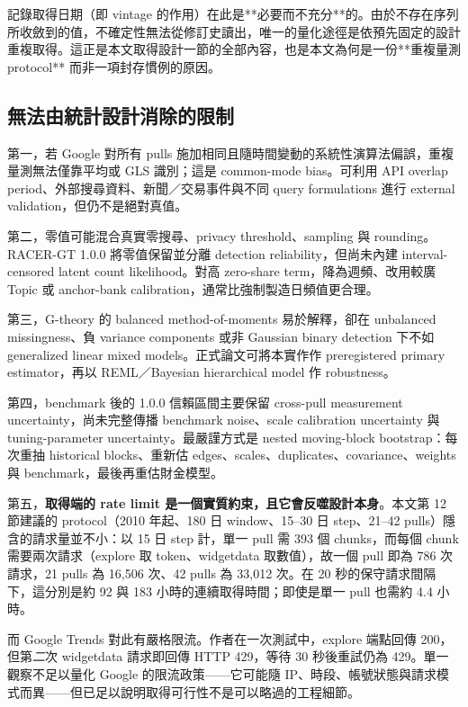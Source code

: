\documentclass[12pt,a4paper,oneside]{article}
\begin{document}
記錄取得日期（即 vintage 的作用）在此是**必要而不充分**的。由於不存在序列所收斂到的值，不確定性無法從修訂史讀出，唯一的量化途徑是依預先固定的設計重複取得。這正是本文取得設計一節的全部內容，也是本文為何是一份**重複量測 protocol** 而非一項封存慣例的原因。

\subsection{無法由統計設計消除的限制}

第一，若 Google 對所有 pulls 施加相同且隨時間變動的系統性演算法偏誤，重複量測無法僅靠平均或 GLS 識別；這是 common-mode bias。可利用 API overlap period、外部搜尋資料、新聞／交易事件與不同 query formulations 進行 external validation，但仍不是絕對真值。

第二，零值可能混合真實零搜尋、privacy threshold、sampling 與 rounding。RACER-GT 1.0.0 將零值保留並分離 detection reliability，但尚未內建 interval-censored latent count likelihood。對高 zero-share term，降為週頻、改用較廣 Topic 或 anchor-bank calibration，通常比強制製造日頻值更合理。

第三，G-theory 的 balanced method-of-moments 易於解釋，卻在 unbalanced missingness、負 variance components 或非 Gaussian binary detection 下不如 generalized linear mixed models。正式論文可將本實作作 preregistered primary estimator，再以 REML／Bayesian hierarchical model 作 robustness。

第四，benchmark 後的 1.0.0 信賴區間主要保留 cross-pull measurement uncertainty，尚未完整傳播 benchmark noise、scale calibration uncertainty 與 tuning-parameter uncertainty。最嚴謹方式是 nested moving-block bootstrap：每次重抽 historical blocks、重新估 edges、scales、duplicates、covariance、weights 與 benchmark，最後再重估財金模型。

第五，\textbf{取得端的 rate limit 是一個實質約束，且它會反噬設計本身}。本文第 12 節建議的 protocol（2010 年起、180 日 window、15--30 日 step、21--42 pulls）隱含的請求量並不小：以 15 日 step 計，單一 pull 需 393 個 chunks，而每個 chunk 需要兩次請求（explore 取 token、widgetdata 取數值），故一個 pull 即為 786 次請求，21 pulls 為 16{,}506 次、42 pulls 為 33{,}012 次。在 20 秒的保守請求間隔下，這分別是約 92 與 183 小時的連續取得時間；即使是單一 pull 也需約 4.4 小時。

而 Google Trends 對此有嚴格限流。作者在一次測試中，explore 端點回傳 200，但第\emph{二}次 widgetdata 請求即回傳 HTTP 429，等待 30 秒後重試仍為 429。單一觀察不足以量化 Google 的限流政策——它可能隨 IP、時段、帳號狀態與請求模式而異——但已足以說明取得可行性不是可以略過的工程細節。
\end{document}
